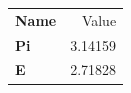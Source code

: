 \documentclass{article}
\begin{document}
\begin{tabular}{>{\bfseries}l r}
  Name & Value \\
  Pi & 3.14159 \\
  E & 2.71828 \\
\end{tabular}
\end{document}

